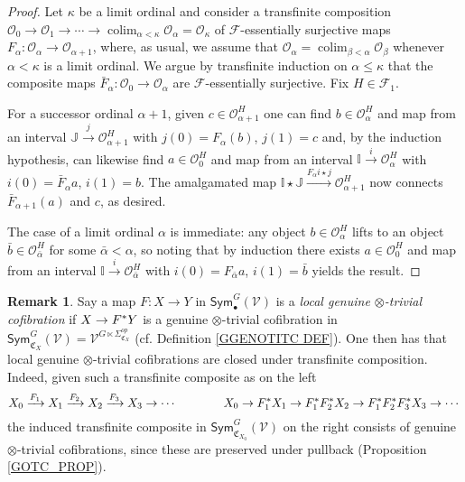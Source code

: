 \documentclass[a4paper,10pt
,draft
]{article}%
\numberwithin{equation}{section}
\numberwithin{figure}{section}
\theoremstyle{definition} %
\newtheorem{remark}[equation]{Remark}%
\DeclareMathOperator{\colim}{colim}%
\newcommand{\F}{\ensuremath{\mathcal F}}
\newcommand{\V}{\ensuremath{\mathcal V}}
\renewcommand{\O}{\ensuremath{\mathcal O}}
\newcommand{\1}{\ensuremath{\mathbbm 1}}%
\begin{document}
\begin{proof}
Let $\kappa$ be a limit ordinal and consider a transfinite composition
$\O_0 \to \O_1 \to \cdots 
\to \colim_{\alpha < \kappa} \O_{\alpha} = \O_{\kappa}$
of $\F$-essentially surjective maps
$F_{\alpha} \colon \O_{\alpha} \to \O_{\alpha +1}$, where, as usual, 
we assume that $\O_{\alpha} = \colim_{\beta < \alpha} \O_{\beta}$ whenever $\alpha < \kappa$ is a limit ordinal.
We argue by transfinite induction on $\alpha \leq \kappa$
that the composite maps $\bar{F}_{\alpha} \colon \O_0 \to \O_{\alpha}$
are $\F$-essentially surjective. Fix $H \in \F_1$.

For a successor ordinal $\alpha+1$, given $c \in \O_{\alpha+1}^H$
one can find $b \in \O_\alpha^H$ and map from an interval 
$\mathbb{J} \xrightarrow{j} \O_{\alpha+1}^H$ with $j(0) = F_{\alpha}(b)$, $j(1)=c$
and, by the induction hypothesis, can likewise find
$a \in \O_0^H$ and map from an interval $\mathbb{I} \xrightarrow{i} \O_\alpha^H$
with $i(0)=\bar{F}_{\alpha}a$, $i(1)=b$.
The amalgamated map
$\mathbb{I} \star \mathbb{J} \xrightarrow{F_{\alpha}i \star j} \O_{\alpha+1}^H$
now connects $\bar{F}_{\alpha+1}(a)$ and $c$, as desired.

The case of a limit ordinal $\alpha$ is immediate: any object $b \in \O_{\alpha}^H$
lifts to an object $\bar{b} \in \O_{\bar{\alpha}}^H$ for some $\bar{\alpha} < \alpha$,
so noting that by induction there exists $a \in \O_0^H$ and map from an interval $\mathbb{I} \xrightarrow{i} \O_{\bar{\alpha}}^H$
with $i(0) = F_{\bar{\alpha}}a$, $i(1) = \bar{b}$ yields the result.
\end{proof}



\begin{remark}\label{LOCOTIMESTRI REM}
	Say a map $F \colon X \to Y$ in 
	$\mathsf{Sym}^{G}_{\bullet}(\V)$
	is a \emph{local genuine $\otimes$-trivial cofibration}
	if  
	$X \to F^{\**}Y$ is a 
	genuine $\otimes$-trivial cofibration in 
	$\mathsf{Sym}^{G}_{\mathfrak{C}_X}(\V) = \V^{G \ltimes \Sigma^{op}_{\mathfrak{C}_{X}}}$
	(cf. Definition \ref{GGENOTITC DEF}).
One then has that local genuine $\otimes$-trivial cofibrations are closed under transfinite composition.
Indeed, given such a transfinite composite as on the left
\[
X_0 \xrightarrow{F_1} 
X_1 \xrightarrow{F_2}
X_2 \xrightarrow{F_3}
X_3 \to \cdots 
\qquad \qquad 
X_0 \to  
F_1^{\**} X_1 \to
F_1^{\**}F_2^{\**}X_2 \to
F_1^{\**}F_2^{\**}F_3^{\**}X_3 \to \cdots 
\]
the induced transfinite composite in $\mathsf{Sym}^{G}_{\mathfrak{C}_{X_0}}(\V)$
on the right consists of 
genuine $\otimes$-trivial cofibrations,
since these are preserved under pullback
(Proposition \ref{GOTC_PROP}).
\end{remark}
\end{document}
